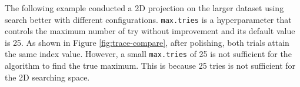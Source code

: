 \documentclass[12pt]{article}
\newenvironment{Shaded}{\begin{snugshade}}{\end{snugshade}}
\newcommand{\DataTypeTok}[1]{\textcolor[rgb]{0.13,0.29,0.53}{#1}}
\newcommand{\DecValTok}[1]{\textcolor[rgb]{0.00,0.00,0.81}{#1}}
\newcommand{\KeywordTok}[1]{\textcolor[rgb]{0.13,0.29,0.53}{\textbf{#1}}}
\newcommand{\NormalTok}[1]{#1}
\newcommand{\OperatorTok}[1]{\textcolor[rgb]{0.81,0.36,0.00}{\textbf{#1}}}
\newcommand{\OtherTok}[1]{\textcolor[rgb]{0.56,0.35,0.01}{#1}}
\newcommand{\StringTok}[1]{\textcolor[rgb]{0.31,0.60,0.02}{#1}}
\begin{document}
\begin{Shaded}
\end{Shaded}

The following example conducted a 2D projection on the larger dataset
using search better with different configurations. \texttt{max.tries} is
a hyperparameter that controls the maximum number of try without
improvement and its default value is 25. As shown in Figure
\ref{fig:trace-compare}, after polishing, both trials attain the same
index value. However, a small \texttt{max.tries} of 25 is not sufficient
for the algorithm to find the true maximum. This is because 25 tries is
not sufficient for the 2D searching space.
\end{document}

